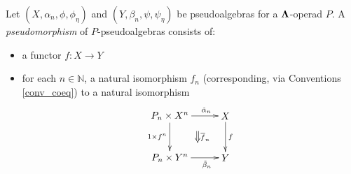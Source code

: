 \begin{Defi}\label{def:ps-morph}
Let $(X, \alpha_n,\phi,\phi_\eta)$ and $(Y, \beta_n,\psi,\psi_{\eta})$ be pseudoalgebras for a $\mathbf{\Lambda}$-operad $P$. A \textit{pseudomorphism} of $P$-pseudoalgebras consists of: 
    \begin{itemize}
        \item a functor $f \colon X \rightarrow Y$
        \item for each $n \in \mathbb{N}$, a natural isomorphism $f_n$ (corresponding, via Conventions \ref{conv_coeq}) to a natural isomorphism
            \[
                \xy
                    (0,0)*+{P_n \times X^n}="00";
                    (20,0)*+{X}="10";
                    (0,-15)*+{P_n \times Y^n}="01";
                    (20,-15)*+{Y}="11";
                    {\ar^>>>>>{\tilde{\alpha}_n} "00" ; "10"};
                    {\ar^{f} "10" ; "11"};
                    {\ar_{1 \times f^n} "00" ; "01"};
                    {\ar_>>>>>{\tilde{\beta}_n} "01" ; "11"};
                    {\ar@{=>}^{\overline{f}_n} (10,-5.5) ; (10,-9.5)};
                \endxy
            \]


\end{itemize}
\end{Defi}
